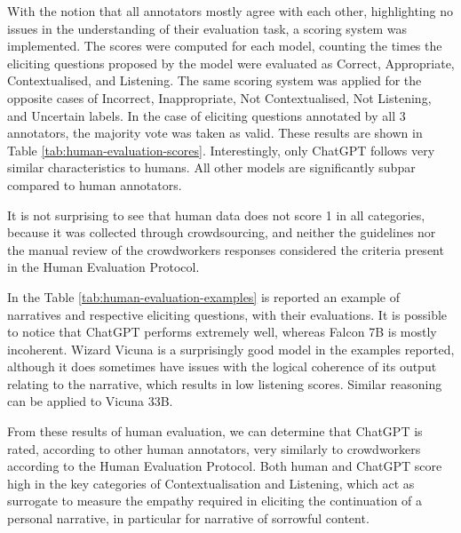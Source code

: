 
With the notion that all annotators mostly agree with each other, highlighting no issues in the understanding of their evaluation task, a scoring system was implemented. The scores were computed for each model, counting the times the eliciting questions proposed by the model were evaluated as Correct, Appropriate, Contextualised, and Listening. The same scoring system was applied for the opposite cases of Incorrect, Inappropriate, Not Contextualised, Not Listening, and Uncertain labels. In the case of eliciting questions annotated by all 3 annotators, the majority vote was taken as valid. These results are shown in Table \ref{tab:human-evaluation-scores}.
Interestingly, only ChatGPT follows very similar characteristics to humans. All other models are significantly subpar compared to human annotators. 


% 
It is not surprising to see that human data does not score 1 in all categories, because it was collected through crowdsourcing, and neither the guidelines nor the manual review of the crowdworkers responses considered the criteria present in the Human Evaluation Protocol. 

In the Table \ref{tab:human-evaluation-examples} is reported an example of narratives and respective eliciting questions, with their evaluations. It is possible to notice that ChatGPT performs extremely well, whereas Falcon 7B is mostly incoherent. Wizard Vicuna is a surprisingly good model in the examples reported, although it does sometimes have issues with the logical coherence of its output relating to the narrative, which results in low listening scores. Similar reasoning can be applied to Vicuna 33B.




From these results of human evaluation, we can determine that ChatGPT is rated, according to other human annotators, very similarly to crowdworkers according to the Human Evaluation Protocol. Both human and ChatGPT score high in the key categories of Contextualisation and Listening, which act as surrogate to measure the empathy required in eliciting the continuation of a personal narrative, in particular for narrative of sorrowful content.